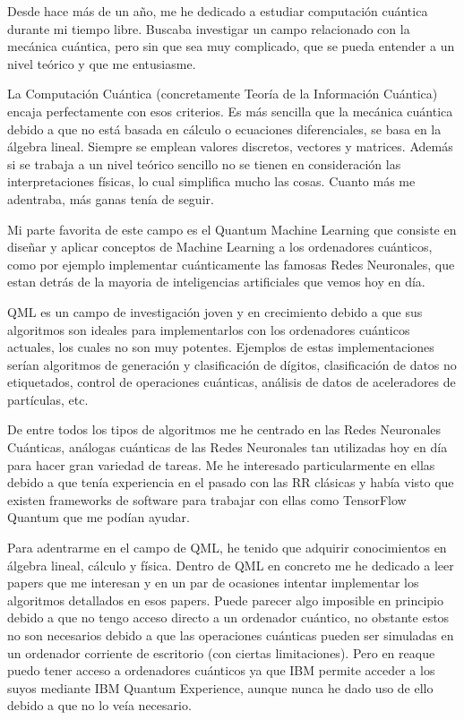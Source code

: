 Desde hace más de un año, me he dedicado a estudiar computación cuántica durante mi tiempo libre. Buscaba investigar un campo relacionado con la mecánica cuántica, pero sin que sea muy complicado, que se pueda entender a un nivel teórico y que me entusiasme.

La Computación Cuántica (concretamente Teoría de la Información Cuántica) encaja perfectamente con esos criterios. Es más sencilla que la mecánica cuántica debido a que no está basada en cálculo o ecuaciones diferenciales, se basa en la álgebra lineal. Siempre se emplean valores discretos, vectores y matrices. Además si se trabaja a un nivel teórico sencillo no se tienen en consideración las interpretaciones físicas, lo cual simplifica mucho las cosas. Cuanto más me adentraba, más ganas tenía de seguir. 

Mi parte favorita de este campo es el Quantum Machine Learning que consiste en diseñar y aplicar conceptos de Machine Learning  a los ordenadores cuánticos, como por ejemplo implementar cuánticamente las famosas Redes Neuronales, que estan detrás de la mayoria de inteligencias artificiales que vemos hoy en día.

QML es un campo de investigación joven y en crecimiento debido a que sus algoritmos son ideales para implementarlos con los ordenadores cuánticos actuales, los cuales no son muy potentes. Ejemplos de estas implementaciones serían algoritmos de generación y clasificación de dígitos, clasificación de datos no etiquetados, control de operaciones cuánticas, análisis de datos de aceleradores de partículas, etc.

De entre todos los tipos de algoritmos me he centrado en las Redes Neuronales Cuánticas, análogas cuánticas de las Redes Neuronales tan utilizadas hoy en día para hacer gran variedad de tareas. Me he interesado particularmente en ellas debido a que tenía experiencia en el pasado con las RR clásicas y había visto que existen frameworks de software para trabajar con ellas como TensorFlow Quantum que me podían ayudar. 

Para adentrarme en el campo de QML, he tenido que adquirir conocimientos en álgebra lineal, cálculo y física. Dentro de QML en concreto me he dedicado a leer papers que me interesan y en un par de ocasiones intentar implementar los algoritmos detallados en esos papers. Puede parecer algo imposible en principio debido a que no tengo acceso directo a un ordenador cuántico,  no obstante estos no son necesarios debido a que las operaciones cuánticas pueden ser simuladas en un ordenador corriente de escritorio (con ciertas limitaciones). Pero en reaque puedo tener acceso a ordenadores cuánticos ya que IBM permite acceder a los suyos mediante IBM Quantum Experience, aunque nunca he dado uso de ello debido a que no lo veía necesario.

